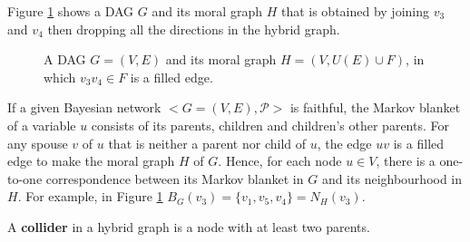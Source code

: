 \begin{example}
Figure \ref{fg:envelope} shows a DAG $G$ and its moral graph $H$ that is obtained by joining $v_3$ and $v_4$ then dropping all the directions in the hybrid graph. 
\label{ex:moral_graph}
\begin{figure}[H]
\centering
{}
\caption{A DAG $G=(V,E)$ and its moral graph $H=(V,U(E)\cup F)$, in which $v_3v_4 \in F$ is a filled edge.}
\label{fg:envelope}
\end{figure}
\end{example}

If a given Bayesian network $<G=(V,E),\mathcal{P}>$ is faithful, the Markov blanket of a variable $u$ consists of its parents, children and children's other parents. For any spouse $v$ of $u$ that is neither a parent nor child of $u$, the edge $uv$ is a filled edge to make the moral graph $H$ of $G$. Hence, for each node $u \in V$, there is a one-to-one correspondence between its Markov blanket in $G$ and its neighbourhood in $H$. For example, in Figure \ref{fg:envelope} $B_G(v_3)=\{v_1,v_5,v_4\}=N_H(v_3)$.
\begin{definition}
\label{def:collider}
A \textbf{collider} in a hybrid graph is a node with at least two parents. 
\end{definition}


